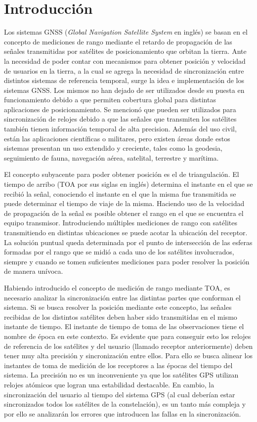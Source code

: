 \documentclass[a4paper,12pt,oneside,onecolumn,final,openright]{book}%
\begin{document}
\section{Introducción}
	Los sistemas GNSS (\textit{Global Navigation Satellite System} en inglés) se basan en el concepto de mediciones de rango mediante el retardo de propagación de las señales transmitidas por satélites de posicionamiento que orbitan la tierra. Ante la necesidad de poder contar con mecanismos para obtener posición y velocidad de usuarios en la tierra, a la cual se agrega la necesidad de sincronización entre distintos sistemas de referencia temporal, surge la idea e implementación de los sistemas GNSS. Los mismos no han dejado de ser utilizados desde su puesta en funcionamiento debido a que permiten cobertura global para distintas aplicaciones de posicionamiento. Se mencionó que pueden ser utilizados para sincronización de relojes debido a que las señales que transmiten los satélites también tienen información temporal de alta precision. Además del uso civil, están las aplicaciones científicas o militares, pero existen áreas donde estos sistemas presentan un uso extendido y creciente, tales como la geodesia, seguimiento de fauna, navegación aérea, satelital, terrestre y marítima.
	
	El concepto subyacente para poder obtener posición es el de triangulación. El tiempo de arribo (TOA por sus siglas en inglés) determina el instante en el que se recibió la señal, conociendo el instante en el que la misma fue transmitida se puede determinar el tiempo de viaje de la misma. Haciendo uso de la velocidad de propagación de la señal es posible obtener el rango en el que se encuentra el equipo transmisor. Introduciendo múltiples mediciones de rango con satélites transmitiendo en distintas ubicaciones se puede acotar la ubicación del receptor. La solución puntual queda determinada por el punto de intersección de las esferas formadas por el rango que se midió a cada uno de los satélites involucrados, siempre y cuando se tomen suficientes mediciones para poder resolver la posición de manera unívoca. 
	
	Habiendo introducido el concepto de medición de rango mediante TOA, es necesario analizar la sincronización entre las distintas partes que conforman el sistema. Si se busca resolver la posición mediante este concepto, las señales recibidas de los distintos satélites deben haber sido transmitidas en el mismo instante de tiempo. El instante de tiempo de toma de las observaciones tiene el nombre de época en este contexto. Es evidente que para conseguir esto los relojes de referencia de los satélites y del usuario (llamado receptor anteriormente) deben tener muy alta precisión y sincronización entre ellos. Para ello se busca alinear los instantes de toma de medición de los receptores a las épocas del tiempo del sistema. La precisión no es un inconveniente ya que los satélites GPS utilizan relojes atómicos que logran una estabilidad destacable. En cambio, la sincronización del usuario al tiempo del sistema GPS (al cual deberían estar sincronizados todos los satélites de la constelación), es un tanto más compleja y por ello se analizarán los errores que introducen las fallas en la sincronización.
	
\end{document}
